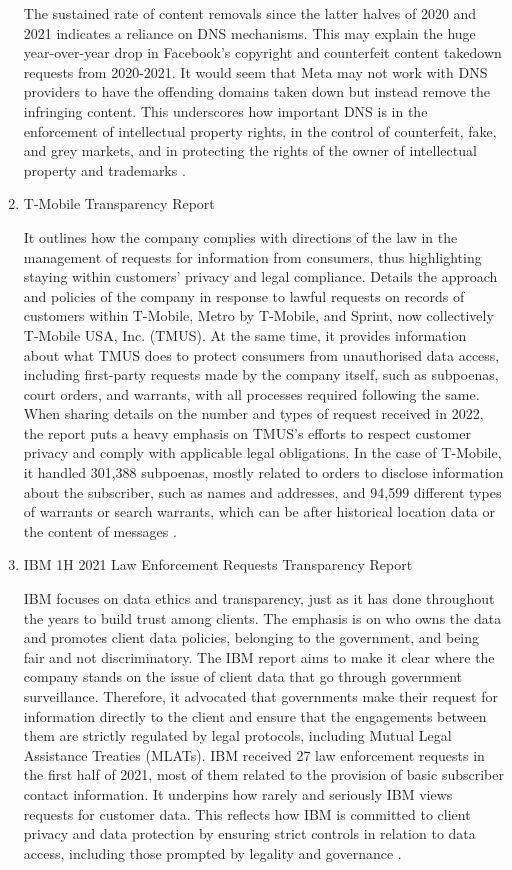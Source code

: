 \begin{enumerate}
The sustained rate of content removals since the latter halves of 2020 and 2021 indicates a reliance on DNS mechanisms. This may explain the huge year-over-year drop in Facebook's copyright and counterfeit content takedown requests from 2020-2021. It would seem that Meta may not work with DNS providers to have the offending domains taken down but instead remove the infringing content. This underscores how important DNS is in the enforcement of intellectual property rights, in the control of counterfeit, fake, and grey markets, and in protecting the rights of the owner of intellectual property and trademarks \cite{Facebook2023}.

\item  T-Mobile Transparency Report

It outlines how the company complies with directions of the law in the management of requests for information from consumers, thus highlighting staying within customers' privacy and legal compliance. Details the approach and policies of the company in response to lawful requests on records of customers within T-Mobile, Metro by T-Mobile, and Sprint, now collectively T-Mobile USA, Inc. (TMUS). At the same time, it provides information about what TMUS does to protect consumers from unauthorised data access, including first-party requests made by the company itself, such as subpoenas, court orders, and warrants, with all processes required following the same. When sharing details on the number and types of request received in 2022, the report puts a heavy emphasis on TMUS's efforts to respect customer privacy and comply with applicable legal obligations. In the case of T-Mobile, it handled 301,388 subpoenas, mostly related to orders to disclose information about the subscriber, such as names and addresses, and 94,599 different types of warrants or search warrants, which can be after historical location data or the content of messages \cite{TMobile2022TransparencyReport}.

\item IBM 1H 2021 Law Enforcement Requests Transparency Report
 
 IBM focuses on data ethics and transparency, just as it has done throughout the years to build trust among clients. The emphasis is on who owns the data and promotes client data policies, belonging to the government, and being fair and not discriminatory. The IBM report aims to make it clear where the company stands on the issue of client data that go through government surveillance. Therefore, it advocated that governments make their request for information directly to the client and ensure that the engagements between them are strictly regulated by legal protocols, including Mutual Legal Assistance Treaties (MLATs). IBM received 27 law enforcement requests in the first half of 2021, most of them related to the provision of basic subscriber contact information. It underpins how rarely and seriously IBM views requests for customer data. This reflects how IBM is committed to client privacy and data protection by ensuring strict controls in relation to data access, including those prompted by legality and governance \cite{IBMTransparencyReport2023}.
 

\end{enumerate}
